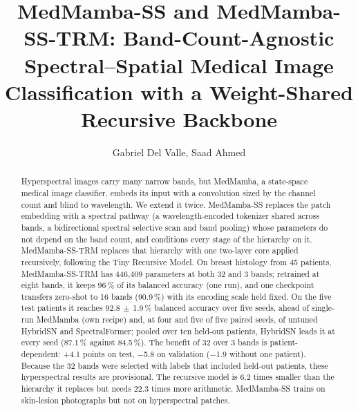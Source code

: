 \documentclass{svproc}
\newcommand{\ms}{\ensuremath{\,\pm\,}}   %
\begin{document}
\mainmatter

\title{MedMamba-SS and MedMamba-SS-TRM: Band-Count-Agnostic Spectral--Spatial Medical Image Classification with a Weight-Shared Recursive Backbone}

\author{Gabriel Del Valle, Saad Ahmed}

\maketitle

\begin{abstract}
Hyperspectral images carry many narrow bands, but MedMamba, a state-space medical image classifier, embeds its input with a convolution sized by the channel count and blind to wavelength. We extend it twice. MedMamba-SS replaces the patch embedding with a spectral pathway (a wavelength-encoded tokenizer shared across bands, a bidirectional spectral selective scan and band pooling) whose parameters do not depend on the band count, and conditions every stage of the hierarchy on it. MedMamba-SS-TRM replaces that hierarchy with one two-layer core applied recursively, following the Tiny Recursive Model. On breast histology from 45 patients, MedMamba-SS-TRM has 446,409 parameters at both 32 and 3 bands; retrained at eight bands, it keeps 96\,\% of its balanced accuracy (one run), and one checkpoint transfers zero-shot to 16 bands (90.9\,\%) with its encoding scale held fixed. On the five test patients it reaches 92.8\ms1.9\,\% balanced accuracy over five seeds, ahead of single-run MedMamba (own recipe) and, at four and five of five paired seeds, of untuned HybridSN and SpectralFormer; pooled over ten held-out patients, HybridSN leads it at every seed (87.1\,\% against 84.5\,\%). The benefit of 32 over 3 bands is patient-dependent: +4.1 points on test, $-$5.8 on validation ($-$1.9 without one patient). Because the 32 bands were selected with labels that included held-out patients, these hyperspectral results are provisional. The recursive model is 6.2 times smaller than the hierarchy it replaces but needs 22.3 times more arithmetic. MedMamba-SS trains on skin-lesion photographs but not on hyperspectral patches.
\end{abstract}
\end{document}
